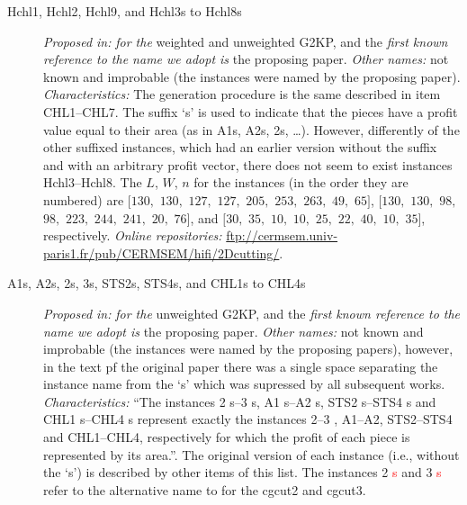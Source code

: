 \documentclass[ppgc,tese,english,formais,babel]{iiufrgs}
\newif\iffinalversion
\newcommand{\oldtext}[1]{\iffinalversion%
\else%
\textcolor{red}{#1}%
\fi%
}
\begin{document}
\begin{description}
\item [Hchl1, Hchl2, Hchl9, and Hchl3s to Hchl8s] \emph{Proposed in:} \citet{cung:2000} \emph{for the} weighted and unweighted G2KP, and the \emph{first known reference to the name we adopt is} the proposing paper. \emph{Other names:} not known and improbable (the instances were named by the proposing paper). \emph{Characteristics: } The generation procedure is the same described in item CHL1--CHL7. The suffix `s' is used to indicate that the pieces have a profit value equal to their area (as in A1s, A2s, 2s, \dots). However, differently of the other suffixed instances, which had an earlier version without the suffix and with an arbitrary profit vector, there does not seem to exist instances Hchl3--Hchl8. The \(L\), \(W\), \(n\) for the instances (in the order they are numbered) are \([130,\) \(130,\) \(127,\) \(127,\) \(205,\) \(253,\) \(263,\) \(49,\) \(65]\), \([130,\) \(130,\) \(98,\) \(98,\) \(223,\) \(244,\) \(241,\) \(20,\) \(76]\), and \([30,\) \(35,\) \(10,\) \(10,\) \(25,\) \(22,\) \(40,\) \(10,\) \(35]\), respectively. \emph{Online repositories:} \url{ftp://cermsem.univ-paris1.fr/pub/CERMSEM/hifi/2Dcutting/}.
\item [A1s, A2s, 2s, 3s, STS2s, STS4s, and CHL1s to CHL4s] \emph{Proposed in:} \citet{cung:2000} \emph{for the} unweighted G2KP, and the \emph{first known reference to the name we adopt is} the proposing paper. \emph{Other names:} not known and improbable (the instances were named by the proposing papers), however, in the text pf the original paper there was a single space separating the instance name from the `s' which was supressed by all subsequent works. \emph{Characteristics: } ``The instances 2 s--3 s, A1 s--A2 s, STS2 s--STS4 s and CHL1 s--CHL4 s represent exactly the instances 2--3 , A1--A2, STS2--STS4 and CHL1--CHL4, respectively for which the profit of each piece is represented by its area.''. \citep{cung:2000} The original version of each instance (i.e., without the `s') is described by other items of this list. The instances 2\oldtext{s} and 3\oldtext{s} refer to the alternative name to for the cgcut2 and cgcut3.

\end{description}
\end{document}
